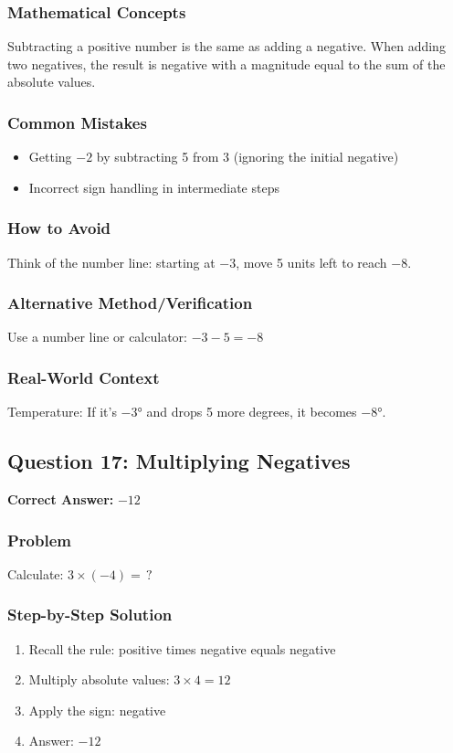 \documentclass[12pt,a4paper]{article}
\begin{document}
\subsubsection*{Mathematical Concepts}
Subtracting a positive number is the same as adding a negative. When adding two negatives, the result is negative with a magnitude equal to the sum of the absolute values.

\subsubsection*{Common Mistakes}
\begin{itemize}
    \item Getting $-2$ by subtracting 5 from 3 (ignoring the initial negative)
    \item Incorrect sign handling in intermediate steps
\end{itemize}

\subsubsection*{How to Avoid}
Think of the number line: starting at $-3$, move 5 units left to reach $-8$.

\subsubsection*{Alternative Method/Verification}
Use a number line or calculator: $-3 - 5 = -8$ 

\subsubsection*{Real-World Context}
Temperature: If it's $-3°$ and drops 5 more degrees, it becomes $-8°$.

\vspace{0.5cm}

\subsection*{Question 17: Multiplying Negatives}

\textbf{Correct Answer:} $-12$

\subsubsection*{Problem}
Calculate: $3 \times (-4) = \,?$

\subsubsection*{Step-by-Step Solution}
\begin{enumerate}
    \item Recall the rule: positive times negative equals negative
    \item Multiply absolute values: $3 \times 4 = 12$
    \item Apply the sign: negative
    \item Answer: $-12$
\end{enumerate}
\end{document}
